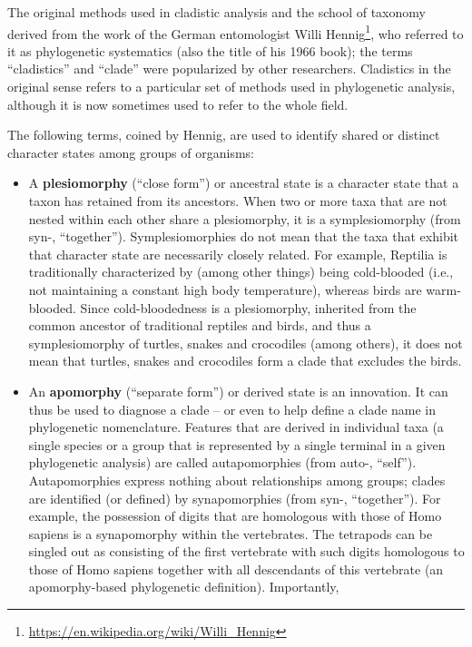 \documentclass[]{book}
\let\rmarkdownfootnote\footnote%
\def\footnote{\protect\rmarkdownfootnote}
\renewcommand{\href}[2]{#2\footnote{\url{#1}}}
\theoremstyle{definition}
\theoremstyle{definition}
\theoremstyle{definition}
\theoremstyle{remark}
\begin{document}
The original methods used in cladistic analysis and the school of
taxonomy derived from the work of the German entomologist \href{https://en.wikipedia.org/wiki/Willi_Hennig}{Willi Hennig},
who referred to it as phylogenetic systematics (also the title of his
1966 book); the terms ``cladistics'' and ``clade'' were popularized by
other researchers. Cladistics in the original sense refers to a
particular set of methods used in phylogenetic analysis, although it is
now sometimes used to refer to the whole field.

The following terms, coined by Hennig, are used to identify shared or
distinct character states among groups of organisms:

\begin{itemize}
\item
  A \textbf{plesiomorphy} (``close form'') or ancestral state is a
  character state that a taxon has retained from its ancestors. When two
  or more taxa that are not nested within each other share a
  plesiomorphy, it is a symplesiomorphy (from syn-, ``together'').
  Symplesiomorphies do not mean that the taxa that exhibit that
  character state are necessarily closely related. For example, Reptilia
  is traditionally characterized by (among other things) being
  cold-blooded (i.e., not maintaining a constant high body temperature),
  whereas birds are warm-blooded. Since cold-bloodedness is a
  plesiomorphy, inherited from the common ancestor of traditional
  reptiles and birds, and thus a symplesiomorphy of turtles, snakes and
  crocodiles (among others), it does not mean that turtles, snakes and
  crocodiles form a clade that excludes the birds.
\item
  An \textbf{apomorphy} (``separate form'') or derived state is an
  innovation. It can thus be used to diagnose a clade -- or even to help
  define a clade name in phylogenetic nomenclature. Features that are
  derived in individual taxa (a single species or a group that is
  represented by a single terminal in a given phylogenetic analysis) are
  called autapomorphies (from auto-, ``self''). Autapomorphies express
  nothing about relationships among groups; clades are identified (or
  defined) by synapomorphies (from syn-, ``together''). For example, the
  possession of digits that are homologous with those of Homo sapiens is
  a synapomorphy within the vertebrates. The tetrapods can be singled
  out as consisting of the first vertebrate with such digits homologous
  to those of Homo sapiens together with all descendants of this
  vertebrate (an apomorphy-based phylogenetic definition). Importantly,

\end{itemize}
\end{document}
